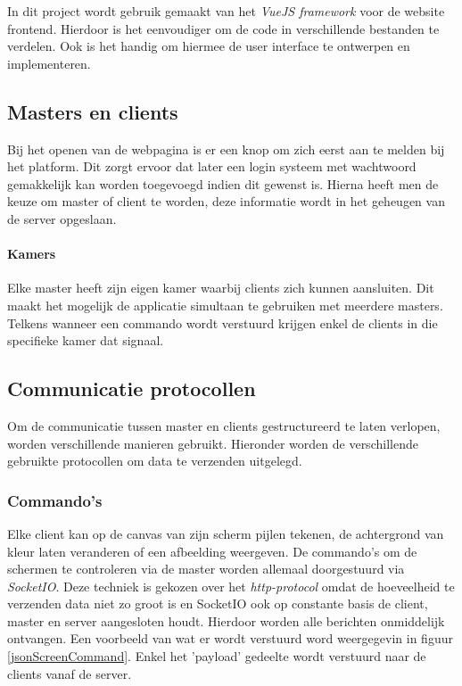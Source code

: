 In dit project wordt gebruik gemaakt van het \textit{VueJS framework} voor de website frontend. Hierdoor is het eenvoudiger om de code in verschillende bestanden te verdelen. Ook is het handig om hiermee de user interface te ontwerpen en implementeren. 


\subsection{Masters en clients}
Bij het openen van de webpagina is er een knop om zich eerst aan te melden bij het platform.
Dit zorgt ervoor dat later een login systeem met wachtwoord gemakkelijk kan worden toegevoegd indien dit gewenst is.
Hierna heeft men de keuze om master of client te worden, deze informatie wordt in het geheugen van de server opgeslaan. 

\paragraph{Kamers} Elke master heeft zijn eigen kamer waarbij clients zich kunnen aansluiten. Dit maakt het mogelijk de applicatie simultaan te gebruiken met meerdere masters. Telkens wanneer een commando wordt verstuurd krijgen enkel de clients in die specifieke kamer dat signaal.

\subsection{Communicatie protocollen}
Om de communicatie tussen master en clients gestructureerd te laten verlopen, worden verschillende manieren gebruikt.
Hieronder worden de verschillende gebruikte protocollen om data te verzenden uitgelegd.
\subsubsection{Commando's}
Elke client kan op de canvas van zijn scherm pijlen tekenen, de achtergrond van kleur laten veranderen of een afbeelding weergeven. De commando's om de schermen te controleren via de master worden allemaal doorgestuurd via \textit{SocketIO}. Deze techniek is gekozen over het \textit{http-protocol} omdat de hoeveelheid te verzenden data niet zo groot is en SocketIO ook op constante basis de client, master en server aangesloten houdt. Hierdoor worden alle berichten onmiddelijk ontvangen. Een voorbeeld van wat er wordt verstuurd word weergegevin in figuur \ref{jsonScreenCommand}.
Enkel het 'payload' gedeelte wordt verstuurd naar de clients vanaf de server.

